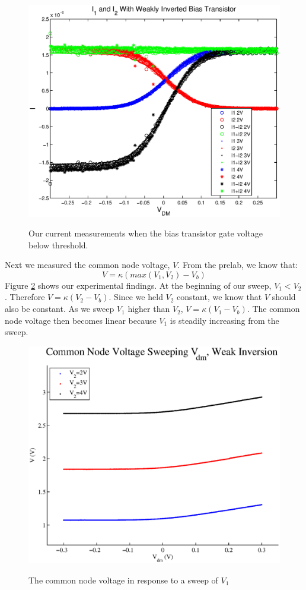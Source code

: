 \documentclass{article}
\begin{document}
\begin{figure}[H]
\centering
\includegraphics[scale=.8]{currents_weak.eps}
\label{weak}
\caption{Our current measurements when the bias transistor gate voltage below threshold.}
\end{figure}

Next we measured the common node voltage, $V$. From the prelab, we know that: \[V= \kappa (max(V_1,V_2)-V_b)\]
Figure \ref{weakV} shows our experimental findings. At the beginning of our sweep, $V_1<V_2$. Therefore $V=\kappa(V_2-V_b)$. Since we held $V_2$ constant, we know that $V$ should also be constant. As we sweep $V_1$ higher than $V_2$, $V=\kappa(V_1-V_b)$. The common node voltage then becomes linear because $V_1$ is steadily increasing from the sweep. 

\begin{figure}[H]
\centering
\includegraphics[scale=.7]{plot_weak_v.eps}
\label{weakV}
\caption{The common node voltage in response to a sweep of $V_1$}
\end{figure}
\end{document}
